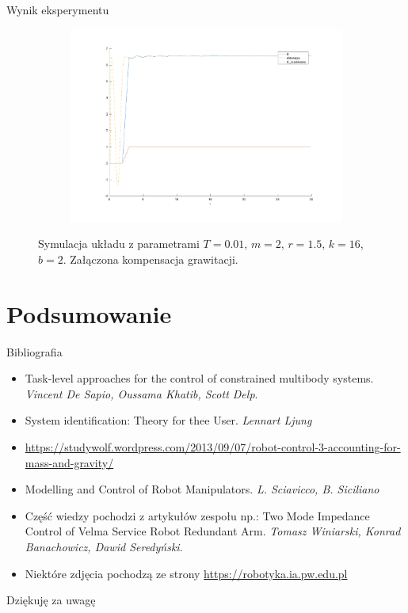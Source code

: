 \documentclass{beamer}
\begin{document}
\begin{frame}[allowframebreaks]{Wynik eksperymentu}
\begin{figure}
	\begin{subfigure}{.5\textwidth}
		\centering
		\includegraphics[width=\linewidth]{mrozenie_u}
		\label{fig:mrozenie_u}
	\end{subfigure}

	\caption{Symulacja układu z parametrami $T=0.01$, $m = 2$, $r = 1.5$, $k = 16$, $b = 2$. Załączona kompensacja grawitacji.}
	\label{fig:mrozenie}
\end{figure}
\end{frame}

\section{Podsumowanie}
\begin{frame}{Bibliografia}
\begin{itemize}
	\item Task-level approaches for the control of constrained multibody systems. \textit{Vincent De Sapio, Oussama Khatib, Scott Delp}.
	\item System identification: Theory for thee User. \textit{Lennart Ljung}
	\item \url{https://studywolf.wordpress.com/2013/09/07/robot-control-3-accounting-for-mass-and-gravity/}
	\item Modelling and Control of Robot Manipulators. \textit{L. Sciavicco, B. Siciliano}
	\item Część wiedzy pochodzi z artykułów zespołu np.: Two Mode Impedance Control of Velma Service Robot Redundant Arm.
	\textit{Tomasz Winiarski, Konrad Banachowicz, Dawid Seredyński}.
	\item Niektóre zdjęcia pochodzą ze strony \url{https://robotyka.ia.pw.edu.pl}

\end{itemize}

\end{frame}
\begin{frame}{Dziękuję za uwagę}
\end{frame}
\end{document}
